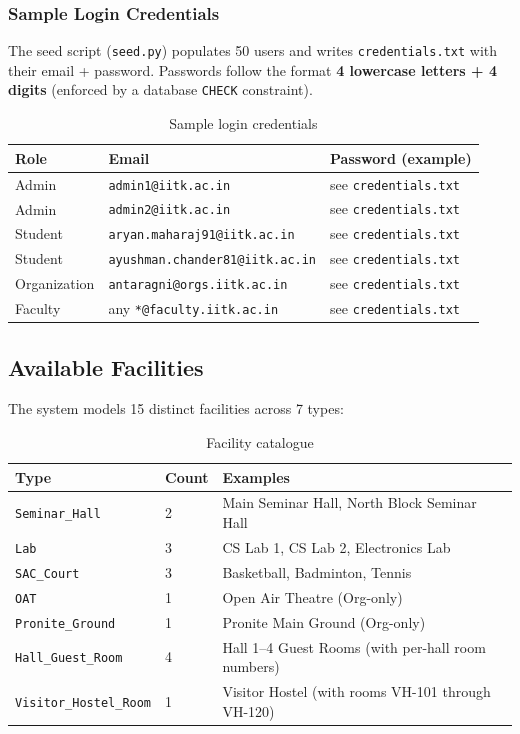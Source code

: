 \documentclass[11pt,a4paper]{article}
\begin{document}
\subsubsection{Sample Login Credentials}

The seed script (\texttt{seed.py}) populates 50 users and writes \texttt{credentials.txt} with their email + password. Passwords follow the format \textbf{4 lowercase letters + 4 digits} (enforced by a database \texttt{CHECK} constraint).

\begin{table}[H]
\centering
\begin{tabularx}{\textwidth}{llX}
\toprule
\textbf{Role} & \textbf{Email} & \textbf{Password (example)} \\
\midrule
Admin           & \texttt{admin1@iitk.ac.in}              & see \texttt{credentials.txt} \\
Admin           & \texttt{admin2@iitk.ac.in}              & see \texttt{credentials.txt} \\
Student         & \texttt{aryan.maharaj91@iitk.ac.in}     & see \texttt{credentials.txt} \\
Student         & \texttt{ayushman.chander81@iitk.ac.in}  & see \texttt{credentials.txt} \\
Organization    & \texttt{antaragni@orgs.iitk.ac.in}      & see \texttt{credentials.txt} \\
Faculty         & any \texttt{*@faculty.iitk.ac.in}       & see \texttt{credentials.txt} \\
\bottomrule
\end{tabularx}
\caption{Sample login credentials}
\end{table}

\subsection{Available Facilities}

The system models 15 distinct facilities across 7 types:

\begin{table}[H]
\centering
\begin{tabularx}{\textwidth}{llX}
\toprule
\textbf{Type} & \textbf{Count} & \textbf{Examples} \\
\midrule
\texttt{Seminar\_Hall}        & 2 & Main Seminar Hall, North Block Seminar Hall \\
\texttt{Lab}                  & 3 & CS Lab 1, CS Lab 2, Electronics Lab \\
\texttt{SAC\_Court}           & 3 & Basketball, Badminton, Tennis \\
\texttt{OAT}                  & 1 & Open Air Theatre (Org-only) \\
\texttt{Pronite\_Ground}      & 1 & Pronite Main Ground (Org-only) \\
\texttt{Hall\_Guest\_Room}    & 4 & Hall 1--4 Guest Rooms (with per-hall room numbers) \\
\texttt{Visitor\_Hostel\_Room} & 1 & Visitor Hostel (with rooms VH-101 through VH-120) \\
\bottomrule
\end{tabularx}
\caption{Facility catalogue}
\end{table}
\end{document}
